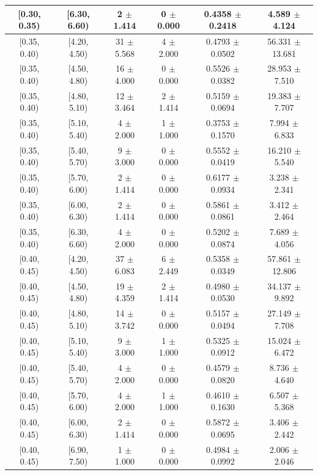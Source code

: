 \begin{longtable}{|c|c|c|c|c|c|}
\hline
[0.30, 0.35) & [6.30, 6.60) & 2 $\pm$ 1.414 & 0 $\pm$ 0.000 & 0.4358 $\pm$ 0.2418 & 4.589 $\pm$ 4.124 \\ 
\hline
[0.35, 0.40) & [4.20, 4.50) & 31 $\pm$ 5.568 & 4 $\pm$ 2.000 & 0.4793 $\pm$ 0.0502 & 56.331 $\pm$ 13.681 \\ 
\hline
[0.35, 0.40) & [4.50, 4.80) & 16 $\pm$ 4.000 & 0 $\pm$ 0.000 & 0.5526 $\pm$ 0.0382 & 28.953 $\pm$ 7.510 \\ 
\hline
[0.35, 0.40) & [4.80, 5.10) & 12 $\pm$ 3.464 & 2 $\pm$ 1.414 & 0.5159 $\pm$ 0.0694 & 19.383 $\pm$ 7.707 \\ 
\hline
[0.35, 0.40) & [5.10, 5.40) & 4 $\pm$ 2.000 & 1 $\pm$ 1.000 & 0.3753 $\pm$ 0.1570 & 7.994 $\pm$ 6.833 \\ 
\hline
[0.35, 0.40) & [5.40, 5.70) & 9 $\pm$ 3.000 & 0 $\pm$ 0.000 & 0.5552 $\pm$ 0.0419 & 16.210 $\pm$ 5.540 \\ 
\hline
[0.35, 0.40) & [5.70, 6.00) & 2 $\pm$ 1.414 & 0 $\pm$ 0.000 & 0.6177 $\pm$ 0.0934 & 3.238 $\pm$ 2.341 \\ 
\hline
[0.35, 0.40) & [6.00, 6.30) & 2 $\pm$ 1.414 & 0 $\pm$ 0.000 & 0.5861 $\pm$ 0.0861 & 3.412 $\pm$ 2.464 \\ 
\hline
[0.35, 0.40) & [6.30, 6.60) & 4 $\pm$ 2.000 & 0 $\pm$ 0.000 & 0.5202 $\pm$ 0.0874 & 7.689 $\pm$ 4.056 \\ 
\hline
[0.40, 0.45) & [4.20, 4.50) & 37 $\pm$ 6.083 & 6 $\pm$ 2.449 & 0.5358 $\pm$ 0.0349 & 57.861 $\pm$ 12.806 \\ 
\hline
[0.40, 0.45) & [4.50, 4.80) & 19 $\pm$ 4.359 & 2 $\pm$ 1.414 & 0.4980 $\pm$ 0.0530 & 34.137 $\pm$ 9.892 \\ 
\hline
[0.40, 0.45) & [4.80, 5.10) & 14 $\pm$ 3.742 & 0 $\pm$ 0.000 & 0.5157 $\pm$ 0.0494 & 27.149 $\pm$ 7.708 \\ 
\hline
[0.40, 0.45) & [5.10, 5.40) & 9 $\pm$ 3.000 & 1 $\pm$ 1.000 & 0.5325 $\pm$ 0.0912 & 15.024 $\pm$ 6.472 \\ 
\hline
[0.40, 0.45) & [5.40, 5.70) & 4 $\pm$ 2.000 & 0 $\pm$ 0.000 & 0.4579 $\pm$ 0.0820 & 8.736 $\pm$ 4.640 \\ 
\hline
[0.40, 0.45) & [5.70, 6.00) & 4 $\pm$ 2.000 & 1 $\pm$ 1.000 & 0.4610 $\pm$ 0.1630 & 6.507 $\pm$ 5.368 \\ 
\hline
[0.40, 0.45) & [6.00, 6.30) & 2 $\pm$ 1.414 & 0 $\pm$ 0.000 & 0.5872 $\pm$ 0.0695 & 3.406 $\pm$ 2.442 \\ 
\hline
[0.40, 0.45) & [6.90, 7.50) & 1 $\pm$ 1.000 & 0 $\pm$ 0.000 & 0.4984 $\pm$ 0.0992 & 2.006 $\pm$ 2.046 \\ 

\end{longtable}
